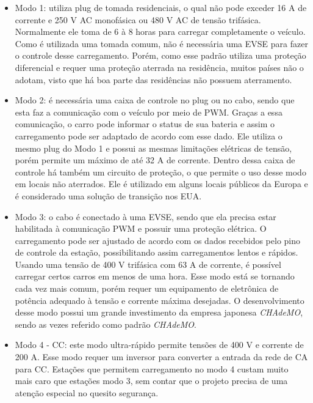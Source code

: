 \begin{itemize}
  \item Modo 1: utiliza plug de tomada residenciais, o qual não pode exceder 16 A de corrente e 250 V \ac{AC} monofásica ou 480 V AC de tensão trifásica. Normalmente ele toma de 6 à 8 horas para carregar completamente o veículo. Como é utilizada uma tomada comum, não é necessária uma EVSE para fazer o controle desse carregamento. Porém, como esse padrão utiliza uma proteção diferencial e requer uma proteção aterrada na residência, muitos países não o adotam, visto que há boa parte das residências não possuem aterramento.

  \item Modo 2: é necessária uma caixa de controle no plug ou no cabo, sendo que esta faz a comunicação com o veículo por meio de \ac{PWM}. Graças a essa comunicação, o carro pode informar o status de sua bateria e assim o carregamento pode ser adaptado de acordo com esse dado. Ele utiliza o mesmo plug do Modo 1 e possui as mesmas limitações elétricas de tensão, porém permite um máximo de até 32 A de corrente. Dentro dessa caixa de controle há também um circuito de proteção, o que permite o uso desse modo em locais não aterrados. Ele é utilizado em alguns locais públicos da Europa e é considerado uma solução de transição nos EUA.

  \item Modo 3: o cabo é conectado à uma EVSE, sendo que ela precisa estar habilitada à comunicação PWM e possuir uma proteção elétrica. O carregamento pode ser ajustado de acordo com os dados recebidos pelo pino de controle da estação, possibilitando assim carregamentos lentos e rápidos. Usando uma tensão de 400 V trifásica com 63 A de corrente, é possível carregar certos carros em menos de uma hora. Esse modo está se tornando cada vez mais comum, porém requer um equipamento de eletrônica de potência adequado à tensão e corrente máxima desejadas. O desenvolvimento desse modo possui um grande investimento da empresa japonesa \textit{CHAdeMO}, sendo as vezes referido como padrão \textit{CHAdeMO}.

  \item Modo 4 - \ac{CC}: este modo ultra-rápido permite tensões de 400 V e corrente de 200 A. Esse modo requer um inversor para converter a entrada da rede de CA para CC. Estações que permitem carregamento no modo 4 custam muito mais caro que estações modo 3, sem contar que o projeto precisa de uma atenção especial no quesito segurança.
\end{itemize}

